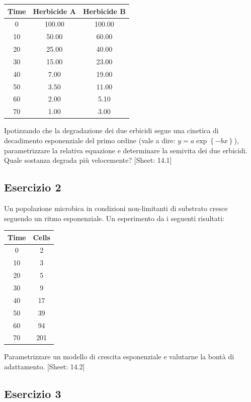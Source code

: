 \documentclass[a4paper,12pt,oneside]{book}
\begin{document}
\begin{longtable}[]{@{}ccc@{}}
\toprule
Time & Herbicide A & Herbicide B \\
\midrule
\endhead
0 & 100.00 & 100.00 \\
10 & 50.00 & 60.00 \\
20 & 25.00 & 40.00 \\
30 & 15.00 & 23.00 \\
40 & 7.00 & 19.00 \\
50 & 3.50 & 11.00 \\
60 & 2.00 & 5.10 \\
70 & 1.00 & 3.00 \\
\bottomrule
\end{longtable}

Ipotizzando che la degradazione dei due erbicidi segue una cinetica di decadimento esponenziale del primo ordine (vale a dire: \(y = a \exp \left\{ - bx \right\}\)), parametrizzare la relativa equazione e determinare la semivita dei due erbicidi. Quale sostanza degrada più velocemente?
{[}Sheet: 14.1{]}

\hypertarget{esercizio-2-9}{%
\subsection{Esercizio 2}\label{esercizio-2-9}}

Un popolazione microbica in condizioni non-limitanti di substrato cresce seguendo un ritmo esponenziale. Un esperimento da i seguenti risultati:

\begin{longtable}[]{@{}cc@{}}
\toprule
Time & Cells \\
\midrule
\endhead
0 & 2 \\
10 & 3 \\
20 & 5 \\
30 & 9 \\
40 & 17 \\
50 & 39 \\
60 & 94 \\
70 & 201 \\
\bottomrule
\end{longtable}

Parametrizzare un modello di crescita esponenziale e valutarne la bontà di adattamento.
{[}Sheet: 14.2{]}

\hypertarget{esercizio-3-8}{%
\subsection{Esercizio 3}\label{esercizio-3-8}}
\end{document}
